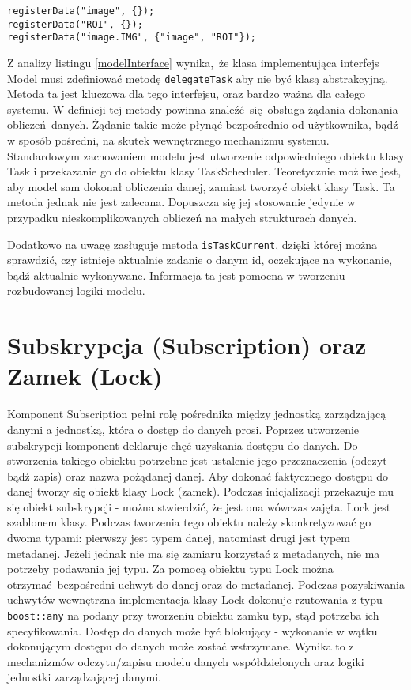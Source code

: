 \begin{minipage}{\textwidth}
	\begin{lstlisting}[label=model:registerData, caption={Przykłady rejestrowania danych},alsoletter={()[].=}]
registerData("image", {});
registerData("ROI", {});
registerData("image.IMG", {"image", "ROI"});
	\end{lstlisting}
\end{minipage}

Z analizy listingu \ref{modelInterface} wynika, że klasa implementująca interfejs Model musi zdefiniować metodę \lstinline$delegateTask$ aby nie być klasą abstrakcyjną. Metoda ta jest kluczowa dla tego interfejsu, oraz bardzo ważna dla całego systemu. W definicji tej metody powinna znaleźć się obsługa żądania dokonania obliczeń danych. Żądanie takie może płynąć bezpośrednio od użytkownika, bądź w sposób pośredni, na skutek wewnętrznego mechanizmu systemu. Standardowym zachowaniem modelu jest utworzenie odpowiedniego obiektu klasy Task i przekazanie go do obiektu klasy TaskScheduler. Teoretycznie możliwe jest, aby model sam dokonał obliczenia danej, zamiast tworzyć obiekt klasy Task. Ta metoda jednak nie jest zalecana. Dopuszcza się jej stosowanie jedynie w przypadku nieskomplikowanych obliczeń na małych strukturach danych. 

Dodatkowo na uwagę zasługuje metoda \lstinline$isTaskCurrent$, dzięki której można sprawdzić, czy istnieje aktualnie zadanie o danym id, oczekujące na wykonanie, bądź aktualnie wykonywane. Informacja ta jest pomocna w tworzeniu rozbudowanej logiki modelu.

\section{Subskrypcja (Subscription) oraz Zamek (Lock)}
Komponent Subscription pełni rolę pośrednika między jednostką zarządzającą danymi a jednostką, która o dostęp do danych prosi. Poprzez utworzenie subskrypcji komponent deklaruje chęć uzyskania dostępu do danych. Do stworzenia takiego obiektu potrzebne jest ustalenie jego przeznaczenia (odczyt bądź zapis) oraz nazwa pożądanej danej. 
Aby dokonać faktycznego dostępu do danej tworzy się obiekt klasy Lock (zamek). Podczas inicjalizacji przekazuje mu się obiekt subskrypcji - można stwierdzić, że jest ona wówczas zajęta. Lock jest szablonem klasy. Podczas tworzenia tego obiektu należy skonkretyzować go dwoma typami: pierwszy jest typem danej, natomiast drugi jest typem metadanej. Jeżeli jednak nie ma się zamiaru korzystać z metadanych, nie ma potrzeby podawania jej typu. Za pomocą obiektu typu Lock można otrzymać bezpośredni uchwyt do danej oraz do metadanej. Podczas pozyskiwania uchwytów wewnętrzna implementacja klasy Lock dokonuje rzutowania z typu \lstinline$boost::any$ na podany przy tworzeniu obiektu zamku typ, stąd potrzeba ich specyfikowania. Dostęp do danych może być blokujący - wykonanie w wątku dokonującym dostępu do danych może zostać wstrzymane. Wynika to z mechanizmów odczytu/zapisu modelu danych współdzielonych oraz logiki jednostki zarządzającej danymi.

